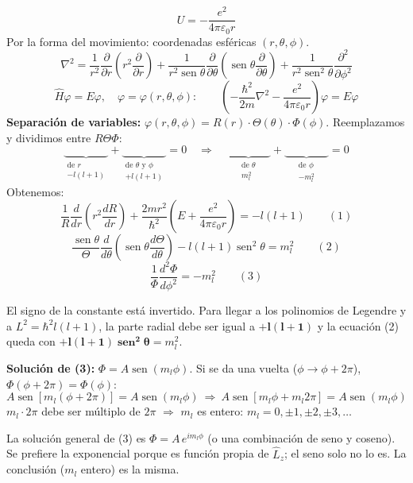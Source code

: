 \documentclass[11pt,a4paper]{article}
\DeclareMathOperator{\sen}{sen}
\begin{document}
\[
U=-\frac{e^2}{4\pi\varepsilon_0r}
\]
Por la forma del movimiento: coordenadas esféricas $(r,\theta,\phi)$.
\[
\nabla^2=\frac{1}{r^2}\frac{\partial}{\partial r}\left(r^2\frac{\partial}{\partial r}\right)
+\frac{1}{r^2\sen\theta}\frac{\partial}{\partial\theta}\left(\sen\theta\frac{\partial}{\partial\theta}\right)
+\frac{1}{r^2\sen^2\theta}\frac{\partial^2}{\partial\phi^2}
\]
\[
\hat H\varphi=E\varphi,\quad \varphi=\varphi(r,\theta,\phi):\qquad
\left(-\frac{\hbar^2}{2m}\nabla^2-\frac{e^2}{4\pi\varepsilon_0r}\right)\varphi=E\varphi
\]
\textbf{Separación de variables:} $\varphi(r,\theta,\phi)=R(r)\cdot\Theta(\theta)\cdot\Phi(\phi)$. Reemplazamos y dividimos entre $R\Theta\Phi$:
\[
\underbrace{\qquad\qquad}_{\substack{\text{de }r\\ -l(l+1)}}+\underbrace{\qquad\qquad}_{\substack{\text{de }\theta\text{ y }\phi\\ +l(l+1)}}=0
\quad\Longrightarrow\quad
\underbrace{\qquad\qquad}_{\substack{\text{de }\theta\\ m_l^2}}+\underbrace{\qquad\qquad}_{\substack{\text{de }\phi\\ -m_l^2}}=0
\]
Obtenemos:
\[
\frac1R\frac{d}{dr}\left(r^2\frac{dR}{dr}\right)+\frac{2mr^2}{\hbar^2}\left(E+\frac{e^2}{4\pi\varepsilon_0r}\right)=-l(l+1)\qquad(1)
\]
\[
\frac{\sen\theta}{\Theta}\frac{d}{d\theta}\left(\sen\theta\frac{d\Theta}{d\theta}\right)-l(l+1)\sen^2\theta=m_l^2\qquad(2)
\]
\[
\frac1\Phi\frac{d^2\Phi}{d\phi^2}=-m_l^2\qquad(3)
\]

\begin{obs}
El signo de la constante está invertido. Para llegar a los polinomios de Legendre y a $L^2=\hbar^2l(l+1)$, la parte radial
debe ser igual a $\boldsymbol{+l(l+1)}$ y la ecuación (2) queda con $\boldsymbol{+l(l+1)\sen^2\theta}=m_l^2$.
\end{obs}

\textbf{Solución de (3):} $\Phi=A\sen(m_l\phi)$. Si se da una vuelta ($\phi\to\phi+2\pi$), $\Phi(\phi+2\pi)=\Phi(\phi)$:
\[
A\sen[m_l(\phi+2\pi)]=A\sen(m_l\phi)\ \Rightarrow\ A\sen[m_l\phi+m_l2\pi]=A\sen(m_l\phi)
\]
$m_l\cdot2\pi$ debe ser múltiplo de $2\pi$ $\Rightarrow$ $m_l$ es entero: $m_l=0,\pm1,\pm2,\pm3,\ldots$

\begin{obs}
La solución general de (3) es $\Phi=A\,e^{im_l\phi}$ (o una combinación de seno y coseno). Se prefiere la exponencial porque
es función propia de $\hat L_z$; el seno solo no lo es. La conclusión ($m_l$ entero) es la misma.
\end{obs}
\end{document}
